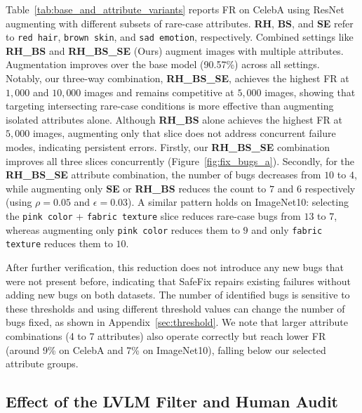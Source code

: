 \documentclass[10pt]{article} %
\begin{document}
Table~\ref{tab:base_and_attribute_variants} reports FR on CelebA using ResNet augmenting with different subsets of rare-case attributes. \textbf{RH}, \textbf{BS}, and \textbf{SE} refer to \texttt{red hair}, \texttt{brown skin}, and \texttt{sad emotion}, respectively. Combined settings like \textbf{RH\_BS} and \textbf{RH\_BS\_SE} (Ours) augment images with multiple attributes. Augmentation improves over the base model (90.57\%) across all settings. Notably, our three-way combination, \textbf{RH\_BS\_SE}, achieves the highest FR at $1,000$ and $10,000$ images and remains competitive at $5,000$ images, showing that targeting intersecting rare-case conditions is more effective than augmenting isolated attributes alone. Although \textbf{RH\_BS} alone achieves the highest FR at $5,000$ images, augmenting only that slice does not address concurrent failure modes, indicating persistent errors. Firstly, our \textbf{RH\_BS\_SE} combination improves all three slices concurrently (Figure~\ref{fig:fix_bugs_a}). Secondly, for the \textbf{RH\_BS\_SE} attribute combination, the number of bugs decreases from $10$ to $4$, while augmenting only \textbf{SE} or \textbf{RH\_BS} reduces the count to $7$ and $6$ respectively (using $\rho=0.05$ and $\epsilon=0.03$). A similar pattern holds on ImageNet10: selecting the \texttt{pink color} + \texttt{fabric texture} slice reduces rare-case bugs from $13$ to $7$, whereas augmenting only \texttt{pink color} reduces them to $9$ and only \texttt{fabric texture} reduces them to $10$.

After further verification, this reduction does not introduce any new bugs that were not present before, indicating that SafeFix repairs existing failures without adding new bugs on both datasets. The number of identified bugs is sensitive to these thresholds and using different threshold values can change the number of bugs fixed, as shown in Appendix~\ref{sec:threshold}. We note that larger attribute combinations (4 to 7 attributes) also operate correctly but reach lower FR (around 9\% on CelebA and 7\% on ImageNet10), falling below our selected attribute groups.

\subsection{Effect of the LVLM Filter and Human Audit}
\label{sec:human_audit}


\begin{table}
\vspace{-10pt}
\centering
\setlength{\tabcolsep}{4pt}
\renewcommand{\arraystretch}{1.0}
\small
\caption{\small{Average error rates (\%) before and after LVLM filtering.}}
\label{tab:lvlm_filter}
\vspace{-8pt}
\end{table}
\end{document}
